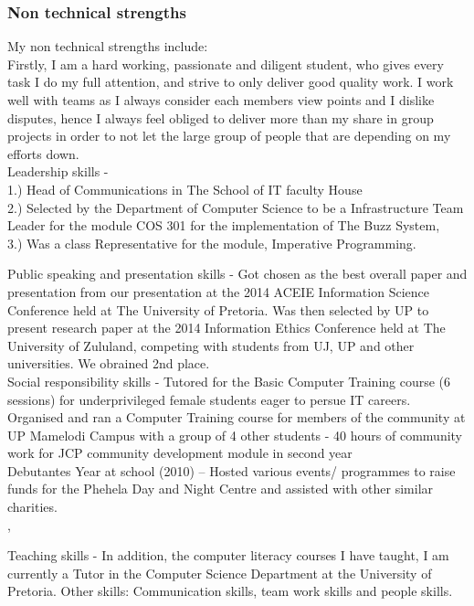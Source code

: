 \documentclass[hidelinks, 12pt, oneside]{article}
\begin{document}
\subsubsection{Non technical strengths}
My non technical strengths include: \\

Firstly, I am a hard working, passionate and diligent student, who gives every task I do my full attention, and strive to only deliver good quality work. I work well with teams as I always consider each members view points and I dislike disputes, hence I always feel obliged to deliver more than my share in group projects in order to not let the large group of people that are depending on my efforts down. 
\\

Leadership skills - 
 \\1.) Head of Communications in The School of IT faculty House
 \\2.) Selected by the Department of Computer Science to be a 	Infrastructure Team Leader for the module COS 301 for the implementation of The Buzz System, 
 \\3.) Was a class Representative for the module, Imperative Programming.
   
Public speaking and presentation skills - Got chosen as the best overall paper and presentation from our presentation at the 2014 ACEIE Information Science Conference held at The University of Pretoria. Was then selected by UP to present research paper at the 2014 Information Ethics Conference held at The University of Zululand, competing with students from UJ, UP and other universities. We obrained 2nd place. 
\\
Social responsibility skills - Tutored for the Basic Computer Training course (6 sessions) for underprivileged female students eager to persue IT careers.\\ 
Organised and ran a Computer Training course for members of the community at UP Mamelodi Campus with a group of 4 other students - 40 hours of community work for JCP community development module in second year \\

Debutantes Year at school (2010) – Hosted various events/ programmes to raise funds for the Phehela Day and Night Centre and assisted with other similar charities.\\,

Teaching skills - In addition, the computer literacy courses I have taught, I am currently a Tutor in the Computer Science Department at the University of Pretoria.
Other skills: 
Communication skills, team work skills and people skills.
\end{document}
